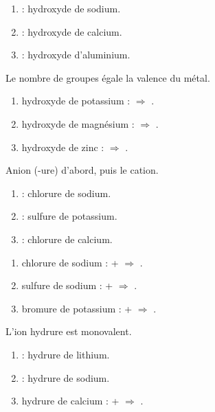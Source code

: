 \documentclass[11pt,a4paper]{article}
\begin{document}
\begin{corrige}
\begin{enumerate}[label=\alph*)]
  \item {} : hydroxyde de sodium.
  \item {} : hydroxyde de calcium.
  \item {} : hydroxyde d'aluminium.
\end{enumerate}
\end{corrige}

\begin{corrige}
Le nombre de groupes  égale la valence du métal.
\begin{enumerate}[label=\alph*)]
  \item hydroxyde de potassium :  $\Rightarrow$ .
  \item hydroxyde de magnésium :  $\Rightarrow$ .
  \item hydroxyde de zinc :  $\Rightarrow$ .
\end{enumerate}
\end{corrige}

\begin{corrige}
Anion (-ure) d'abord, puis le cation.
\begin{enumerate}[label=\alph*)]
  \item {} : chlorure de sodium.
  \item {} : sulfure de potassium.
  \item {} : chlorure de calcium.
\end{enumerate}
\end{corrige}

\begin{corrige}
\begin{enumerate}[label=\alph*)]
  \item chlorure de sodium :  +  $\Rightarrow$ .
  \item sulfure de sodium :  +  $\Rightarrow$ .
  \item bromure de potassium :  +  $\Rightarrow$ .
\end{enumerate}
\end{corrige}

\begin{corrige}
L'ion hydrure  est monovalent.
\begin{enumerate}[label=\alph*)]
  \item {} : hydrure de lithium.
  \item {} : hydrure de sodium.
  \item hydrure de calcium :  +  $\Rightarrow$ .
\end{enumerate}
\end{corrige}
\end{document}
